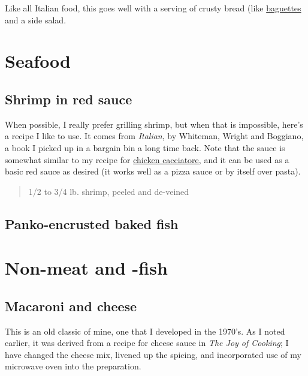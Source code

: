 \documentclass[
]{book}
\begin{document}
Like all Italian food, this goes well with a serving of crusty bread (like \protect\hyperlink{baguettes}{baguettes} and a side salad.

\hypertarget{coseafood}{%
\section{Seafood}\label{coseafood}}

\hypertarget{shrimp-in-red-sauce}{%
\subsection{Shrimp in red sauce}\label{shrimp-in-red-sauce}}

When possible, I really prefer grilling shrimp, but when that is impossible, here's a recipe I like to use. It comes from \emph{Italian}, by Whiteman, Wright and Boggiano, a book I picked up in a bargain bin a long time back. Note that the sauce is somewhat similar to my recipe for \protect\hyperlink{cacciatore}{chicken cacciatore}, and it can be used as a basic red sauce as desired (it works well as a pizza sauce or by itself over pasta).

\begin{quote}
1/2 to 3/4 lb. shrimp, peeled and de-veined
\end{quote}

\hypertarget{panko-encrusted-baked-fish}{%
\subsection{Panko-encrusted baked fish}\label{panko-encrusted-baked-fish}}

\hypertarget{conomeat}{%
\section{Non-meat and -fish}\label{conomeat}}

\hypertarget{macaroni-and-cheese}{%
\subsection{Macaroni and cheese}\label{macaroni-and-cheese}}

This is an old classic of mine, one that I developed in the 1970's. As I noted earlier, it was derived from a recipe for cheese sauce in \emph{The Joy of Cooking}; I have changed the cheese mix, livened up the spicing, and incorporated use of my microwave oven into the preparation.
\end{document}
